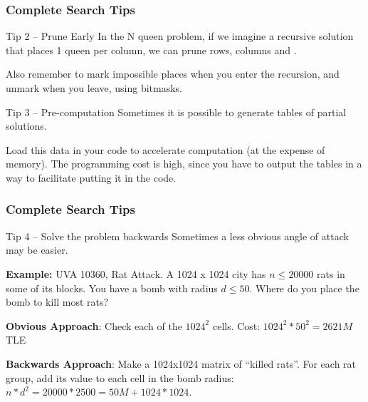 \begin{frame}
  \frametitle{Complete Search Tips}
    \begin{block}{Tip 2 -- Prune Early}
      In the N queen problem, if we imagine a recursive solution that
      places 1 queen per column, we can prune rows, columns and
      .

      \smallskip

      Also remember to mark impossible places when you enter the
      recursion, and unmark when you leave, using bitmasks.
    \end{block}

    \vfill

    \begin{block}{Tip 3 -- Pre-computation}
      Sometimes it is possible to generate tables of partial solutions.

      \medskip

      Load this data in your code to accelerate computation (at the
      expense of memory). The programming cost is high, since you have
      to output the tables in a way to facilitate putting it in the
      code.
    \end{block}
\end{frame}


\begin{frame}%
  \frametitle{Complete Search Tips}
    \begin{block}{Tip 4 -- Solve the problem backwards}
      Sometimes a less obvious angle of attack may be easier.
      \bigskip

      {\bf Example:} UVA 10360, Rat Attack. A 1024 x 1024 city has $n \leq 20000$ rats in some of its blocks. You have a bomb with radius $d \leq 50$. Where do you place the bomb to kill most rats?
      \bigskip

      {\bf Obvious Approach}: Check each of the $1024^2$
      cells. Cost: $1024^2*50^2 = 2621M$ TLE
      \medskip

      {\bf Backwards Approach}: Make a 1024x1024 matrix of ``killed rats''. For each rat group, add its value to each cell in the bomb radius: $n * d^2 = 20000*2500 = 50M + 1024*1024$.
    \end{block}
\end{frame}

